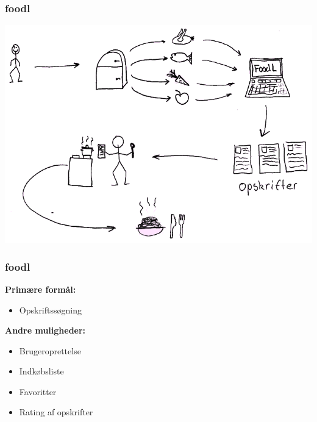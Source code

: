 \begin{frame}
\frametitle{foodl}

	\begin{center}
		\includegraphics[scale=0.5]{billeder/anvendelsesomraade.png}
	\end{center}
	
\end{frame}

\begin{frame}
\frametitle{foodl}

	\textbf{Primære formål:}
	\begin{itemize}
		\item Opskriftssøgning
	\end{itemize}	
	
	\textbf{Andre muligheder:}
	\begin{itemize}	
		\item Brugeroprettelse
		\item Indkøbsliste
		\item Favoritter
		\item Rating af opskrifter
	\end{itemize}

\end{frame}